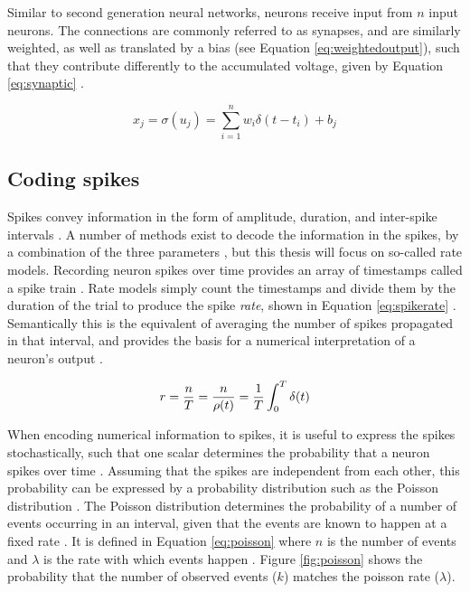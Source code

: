 \documentclass[report.tex]{subfiles}
\begin{document}
Similar to second generation neural networks, neurons
receive input from $n$ input neurons.
The connections are commonly referred to as synapses, and are similarly
weighted, as well as translated by a bias (see Equation \ref{eq:weightedoutput}),
such that they contribute differently to the accumulated 
voltage, given by Equation \ref{eq:synaptic} \cite{Dayan2001}.

\begin{equation}
  x_j = \sigma(u_j) = \sum_{i=1}^n{w_i\delta(t - t_i)} + b_j
  \label{eq:synaptic}
\end{equation}

\subsection{Coding spikes}
Spikes convey information in the form of amplitude, duration, and
inter-spike intervals \cite{Dayan2001}.
A number of methods exist to decode the information in the spikes, by a 
combination of the three parameters \cite{Dayan2001, Eliasmith2015, Diehl2015, Rueckauer2017},
but this thesis will
focus on so-called rate models.
Recording neuron spikes over time provides an array of timestamps called a
spike train \cite{Eliasmith2015}.
Rate models simply count the timestamps and divide them by the duration of
the trial to produce the spike \textit{rate}, shown
in Equation \ref{eq:spikerate} \cite{Dayan2001, Eliasmith2004}.
Semantically this is the equivalent of averaging the number of spikes propagated
in that interval, and provides the basis for a numerical interpretation of a
neuron's output \cite{Eliasmith2004}.

\begin{equation}
  r = {n \over T} = {n \over \rho(t)} = {1 \over T} \int_0^T \delta(t)
\label{eq:spikerate}
\end{equation}

When encoding numerical information to spikes, it is useful to 
express the spikes stochastically, such that one scalar determines
the probability that a neuron spikes over time \cite{Dayan2001}.
Assuming that the spikes are independent from each other, this
probability can be expressed by a probability distribution such as the
Poisson distribution
\cite{Dayan2001}.
The Poisson distribution determines the probability of a number
of events occurring in an interval, given that the events are
known to happen at a fixed rate \cite{Dayan2001}.
It is defined in Equation \ref{eq:poisson} where $n$ is the
number of events and $\lambda$ is the rate with which events
happen \cite{Dayan2001}.
Figure \ref{fig:poisson} shows the probability that the number of
observed events ($k$) matches the poisson rate ($\lambda$).
\end{document}
